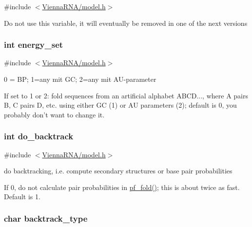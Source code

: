 {\ttfamily \#include $<$\hyperlink{model_8h}{Vienna\-R\-N\-A/model.\-h}$>$}

Do not use this variable, it will eventually be removed in one of the next versions \hypertarget{group__model__details_gafb1ef1166da85092ae8a325e02dcae71}{
\subsubsection[{energy\-\_\-set}]{\setlength{\rightskip}{0pt plus 5cm}int energy\-\_\-set}}\label{group__model__details_gafb1ef1166da85092ae8a325e02dcae71}


{\ttfamily \#include $<$\hyperlink{model_8h}{Vienna\-R\-N\-A/model.\-h}$>$}



0 = B\-P; 1=any mit G\-C; 2=any mit A\-U-\/parameter 

If set to 1 or 2\-: fold sequences from an artificial alphabet A\-B\-C\-D..., where A pairs B, C pairs D, etc. using either G\-C (1) or A\-U parameters (2); default is 0, you probably don't want to change it. \hypertarget{group__model__details_gad512b5dd4dbec60faccfe137bb474489}{
\subsubsection[{do\-\_\-backtrack}]{\setlength{\rightskip}{0pt plus 5cm}int do\-\_\-backtrack}}\label{group__model__details_gad512b5dd4dbec60faccfe137bb474489}


{\ttfamily \#include $<$\hyperlink{model_8h}{Vienna\-R\-N\-A/model.\-h}$>$}



do backtracking, i.\-e. compute secondary structures or base pair probabilities 

If 0, do not calculate pair probabilities in \hyperlink{group__pf__fold_gadc3db3d98742427e7001a7fd36ef28c2}{pf\-\_\-fold()}; this is about twice as fast. Default is 1. \hypertarget{group__model__details_ga83bdb43472a259c71e69fa9f70f420c3}{
\subsubsection[{backtrack\-\_\-type}]{\setlength{\rightskip}{0pt plus 5cm}char backtrack\-\_\-type}}\label{group__model__details_ga83bdb43472a259c71e69fa9f70f420c3}


